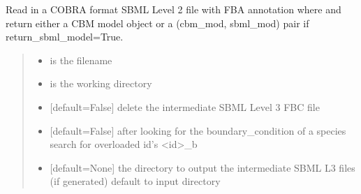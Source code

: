 \documentclass[letterpaper,12pt,english]{sphinxmanual}
\begin{document}
\begin{fulllineitems}

\pysigstartsignatures
\pysiglinewithargsret
{}
{\sphinxparamcomma {}\sphinxparamcomma {}\sphinxparamcomma {}\sphinxparamcomma {}\sphinxparamcomma {}\sphinxparamcomma {}\sphinxparamcomma {}}
{}
\pysigstopsignatures
\sphinxAtStartPar
Read in a COBRA format SBML Level 2 file with FBA annotation where and return either a CBM model object or a (cbm\_mod, sbml\_mod) pair if return\_sbml\_model=True.
\begin{quote}\begin{description}
\begin{itemize}
\item {} 
\sphinxAtStartPar
{} \textendash{} is the filename

\item {} 
\sphinxAtStartPar
{} \textendash{} is the working directory

\item {} 
\sphinxAtStartPar
{} \textendash{} {[}default=False{]} delete the intermediate SBML Level 3 FBC file

\item {} 
\sphinxAtStartPar
{} \textendash{} {[}default=False{]} after looking for the boundary\_condition of a species search for overloaded id’s \textless{}id\textgreater{}\_b

\item {} 
\sphinxAtStartPar
{} \textendash{} {[}default=None{]} the directory to output the intermediate SBML L3 files (if generated) default to input directory


\end{itemize}
\end{description}
\end{quote}
\end{fulllineitems}
\end{document}
